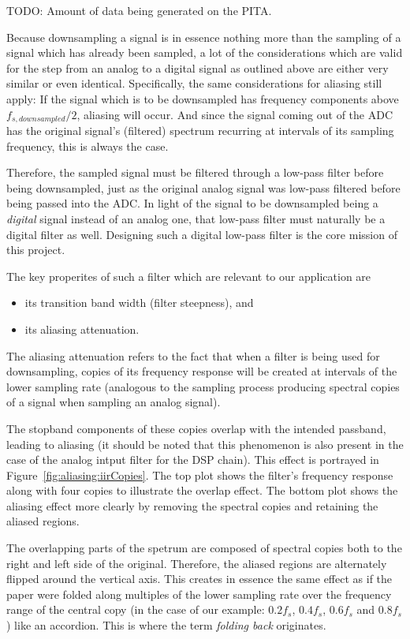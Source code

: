TODO: Amount of data being generated on the PITA.

Because downsampling a signal is in  essence nothing more than the sampling of
a signal which has already been sampled, a lot of the considerations which are
valid for the  step from an analog  to a digital signal as  outlined above are
either very  similar or even identical. Specifically,  the same considerations
for  aliasing still  apply: If  the  signal which  is  to  be downsampled  has
frequency components  above $f_{s,  downsampled}/2$, aliasing  will occur. And
since the  signal coming out of  the ADC has the  original signal's (filtered)
spectrum recurring at intervals of its  sampling frequency, this is always the
case.

Therefore,  the sampled  signal must  be  filtered through  a low-pass  filter
before  being downsampled,  just as  the original  analog signal  was low-pass
filtered  before being  passed into  the  ADC. In light  of the  signal to  be
downsampled  being a  \emph{digital} signal  instead  of an  analog one,  that
low-pass filter must  naturally be a digital filter as  well. Designing such a
digital low-pass filter is the core mission of this project.

The key properites of such a filter which are relevant to our application are
\begin{itemize}\tightlist
    \item
        its transition band width (filter steepness), and
    \item
        its aliasing attenuation.
\end{itemize}
The aliasing attenuation refers  to the fact that when a  filter is being used
for  downsampling,  copies  of  its  frequency response  will  be  created  at
intervals  of the  lower  sampling  rate (analogous  to  the sampling  process
producing spectral copies of a signal when sampling an analog signal).

The stopband  components of these  copies overlap with the  intended passband,
leading to aliasing  (it should be noted that this  phenomenon is also present
in the  case of the  analog intput filter for  the DSP chain). This  effect is
portrayed  in  Figure~\ref{fig:aliasing:iirCopies}. The  top  plot  shows  the
filter's frequency response  along with four copies to  illustrate the overlap
effect. The bottom plot shows the aliasing effect more clearly by removing the
spectral copies and retaining the aliased regions.

The overlapping parts  of the spetrum are composed of  spectral copies both to
the right  and left side of  the original. Therefore, the aliased  regions are
alternately flipped around the vertical axis. This creates in essence the same
effect  as if  the paper  were folded  along multiples  of the  lower sampling
rate  over the  frequency  range of  the  central  copy (in  the  case of  our
example: $0.2f_s$, $0.4f_s$, $0.6f_s$ and $0.8f_s$) like an accordion. This is
where the term \emph{folding back} originates.

